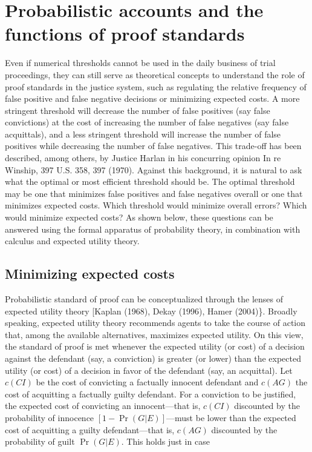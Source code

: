 \documentclass[10pt,dvipsnames]{scrartcl}
\begin{document}
\section{Probabilistic accounts and the functions of proof
standards}\label{probabilistic-accounts-and-the-functions-of-proof-standards}

Even if numerical thresholds cannot be used in the daily business of
trial proceedings, they can still serve as theoretical concepts to
understand the role of proof standards in the justice system, such as
regulating the relative frequency of false positive and false negative
decisions or minimizing expected costs. A more stringent threshold will
decrease the number of false positives (say false convictions) at the
cost of increasing the number of false negatives (say false acquittals),
and a less stringent threshold will increase the number of false
positives while decreasing the number of false negatives. This trade-off
has been described, among others, by Justice Harlan in his concurring
opinion In re Winship, 397 U.S. 358, 397 (1970). Against this
background, it is natural to ask what the optimal or most efficient
threshold should be. The optimal threshold may be one that minimizes
false positives and false negatives overall or one that minimizes
expected costs. Which threshold would minimize overall errors? Which
would minimize expected costs? As shown below, these questions can be
answered using the formal apparatus of probability theory, in
combination with calculus and expected utility theory.

\subsection{Minimizing expected costs}\label{minimizing-expected-costs}

Probabilistic standard of proof can be conceptualized through the lenses
of expected utility theory {[}Kaplan (1968), Dekay (1996), Hamer
(2004)\}. Broadly speaking, expected utility theory recommends agents to
take the course of action that, among the available alternatives,
maximizes expected utility. On this view, the standard of proof is met
whenever the expected utility (or cost) of a decision against the
defendant (say, a conviction) is greater (or lower) than the expected
utility (or cost) of a decision in favor of the defendant (say, an
acquittal). Let \(c(CI)\) be the cost of convicting a factually innocent
defendant and \(c(AG)\) the cost of acquitting a factually guilty
defendant. For a conviction to be justified, the expected cost of
convicting an innocent---that is, \(c(CI)\) discounted by the
probability of innocence \([1-\Pr(G|E)]\)---must be lower than the
expected cost of acquitting a guilty defendant---that is, \(c(AG)\)
discounted by the probability of guilt \(\Pr(G|E)\). This holds just in
case
\end{document}
